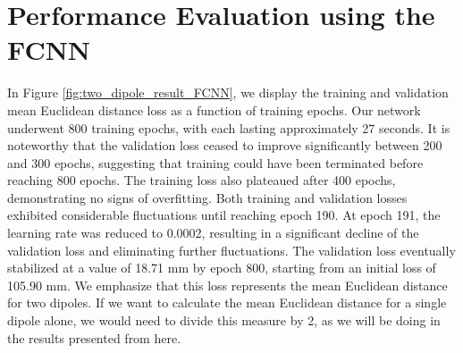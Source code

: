 \documentclass[a4paper, UKenglish, 11pt]{uiomaster}
\begin{document}
\section{Performance Evaluation using the FCNN}
In Figure \ref{fig:two_dipole_result_FCNN}, we display the training and validation mean Euclidean distance loss as a function of training epochs. Our network underwent 800 training epochs, with each lasting approximately 27 seconds. It is noteworthy that the validation loss ceased to improve significantly between 200 and 300 epochs, suggesting that training could have been terminated before reaching 800 epochs. The training loss also plateaued after 400 epochs, demonstrating no signs of overfitting. Both training and validation losses exhibited considerable fluctuations until reaching epoch 190. At epoch 191, the learning rate was reduced to 0.0002, resulting in a significant decline of the validation loss and eliminating further fluctuations. The validation loss eventually stabilized at a value of 18.71 mm by epoch 800, starting from an initial loss of 105.90 mm. We emphasize that this loss represents the mean Euclidean distance for two dipoles. If we want to calculate the mean Euclidean distance for a single dipole alone, we would need to divide this measure by 2, as we will be doing in the results presented from here.



\end{document}
